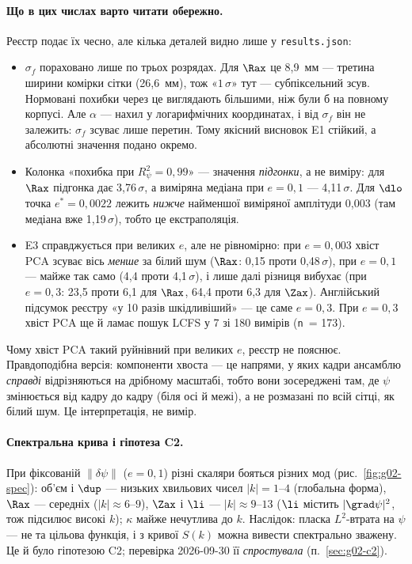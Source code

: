 \paragraph{Що в цих числах варто читати обережно.} Реєстр подає їх чесно, але кілька
деталей видно лише у \texttt{results.json}:
\begin{itemize}
\item $\sigma_f$ пораховано лише по трьох розрядах. Для $\Rax$ це 8,9~мм --- третина
  ширини комірки сітки (26,6~мм), тож «$1\,\sigma$» тут --- субпіксельний зсув. Нормовані
  похибки через це виглядають більшими, ніж були б на повному корпусі. Але $\alpha$ --- нахил
  у логарифмічних координатах, і від $\sigma_f$ він не залежить: $\sigma_f$ зсуває лише
  перетин. Тому якісний висновок E1 стійкий, а абсолютні значення подано окремо.
\item Колонка «похибка при $R^2_\psi=0{,}99$» --- значення \emph{підгонки}, а не
  виміру: для $\Rax$ підгонка дає 3,76$\,\sigma$, а виміряна медіана при $e=0{,}1$ ---
  4,11$\,\sigma$. Для $\dlo$ точка $e^{*}=0{,}0022$ лежить \emph{нижче} найменшої виміряної
  амплітуди 0,003 (там медіана вже 1,19$\,\sigma$), тобто це екстраполяція.
\item E3 справджується при великих $e$, але не рівномірно: при $e=0{,}003$ хвіст PCA
  зсуває вісь \emph{менше} за білий шум ($\Rax$: 0,15 проти 0,48$\,\sigma$), при $e=0{,}1$ ---
  майже так само (4,4 проти 4,1$\,\sigma$), і лише далі різниця вибухає (при $e=0{,}3$:
  23,5 проти 6,1 для $\Rax$, 64,4 проти 6,3 для $\Zax$). Англійський підсумок реєстру
  «у 10 разів шкідливіший» --- це саме $e=0{,}3$. При $e=0{,}3$ хвіст PCA ще й ламає
  пошук LCFS у 7 зі 180 вимірів (\texttt{n}~= 173).
\end{itemize}
Чому хвіст PCA такий руйнівний при великих $e$, реєстр не пояснює. Правдоподібна
версія: компоненти хвоста --- це напрями, у яких кадри ансамблю \emph{справді} відрізняються
на дрібному масштабі, тобто вони зосереджені там, де $\psi$ змінюється від кадру до
кадру (біля осі й межі), а не розмазані по всій сітці, як білий шум. Це інтерпретація, не
вимір.

\paragraph{Спектральна крива і гіпотеза C2.} При фіксованій $\|\delta\psi\|$ ($e=0{,}1$)
різні скаляри бояться різних мод (рис.~\ref{fig:g02-spec}): об'єм і $\dup$ --- низьких
хвильових чисел $|k|=1\text{--}4$ (глобальна форма), $\Rax$ --- середніх ($|k|\approx6\text{--}9$),
$\Zax$ і $\li$ --- $|k|\approx9\text{--}13$ ($\li$ містить $|\grad\psi|^2$, тож підсилює
високі $k$); $\kappa$ майже нечутлива до $k$. Наслідок: пласка $L^2$-втрата на $\psi$ ---
не та цільова функція, і з кривої $S(k)$ можна вивести спектрально зважену. Це й було
гіпотезою C2; перевірка 2026-09-30 її \emph{спростувала} (п.~\ref{sec:g02-c2}).

